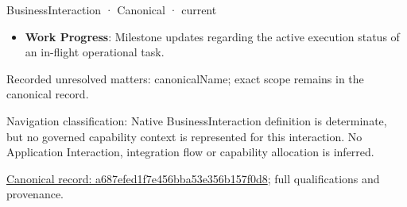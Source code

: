 \label{element:a687efed1f7e456bba53e356b157f0d8}
{\small BusinessInteraction · Canonical · current}\par

\begin{itemize}


\item \textbf{Work Progress}: Milestone updates regarding the active execution status of an in-flight operational task.

\end{itemize}

{\small Recorded unresolved matters: canonicalName; exact scope remains in the canonical record.}\par
{\small Navigation classification: Native BusinessInteraction definition is determinate, but no governed capability context is represented for this interaction. No Application Interaction, integration flow or capability allocation is inferred.}\par
{\footnotesize \href{../../../../continuum/business/business-interaction/a687efed1f7e456bba53e356b157f0d8.md}{Canonical record: a687efed1f7e456bba53e356b157f0d8}; full qualifications and provenance.}\par
